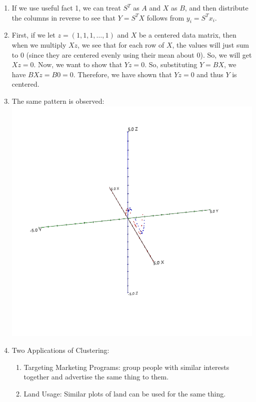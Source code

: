 \documentclass{article}
\begin{document}
\begin{enumerate}
\item If we use useful fact 1, we can treat $S^T$ as $A$ and $X$ as $B$, and then distribute the columns in reverse to see that $Y=S^TX$ follows from $y_i = S^Tx_i$. 

\item First, if we let $z=(1, 1, 1, \dots, 1)$ and $X$ be a centered data matrix, then when we multiply $Xz$, we see that for each row of $X$, the values will just sum to 0 (since they are centered evenly using their mean about 0). So, we will get $Xz = 0$. Now, we want to show that $Yz = 0$. So, substituting $Y = BX$, we have $BXz = B0 = 0$. Therefore, we have shown that $Yz = 0$ and thus $Y$ is centered. 

\item The same pattern is observed:\\
\includegraphics[scale=0.3]{exercise22}

\item Two Applications of Clustering:
	\begin{enumerate}
		\item Targeting Marketing Programs: group people with similar interests together and advertise the same thing to them.
		\item Land Usage: Similar plots of land can be used for the same thing. 
	\end{enumerate}
	

\end{enumerate}
\end{document}
